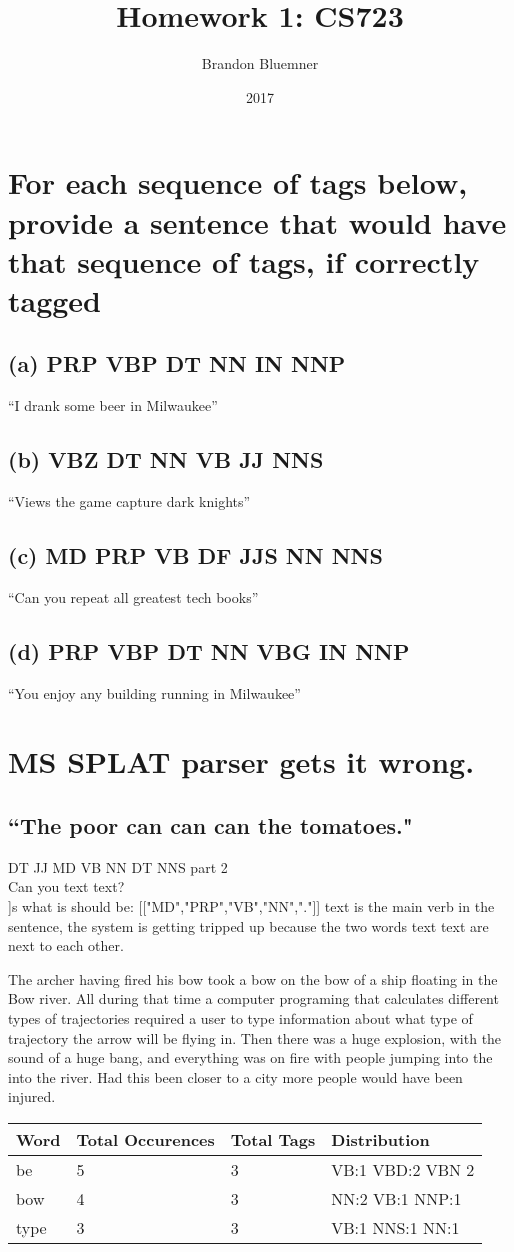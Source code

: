 \documentclass[12pt]{article}
\begin{document}
\title{Homework 1: CS723}
\author{Brandon Bluemner}
\date{2017}
\maketitle
\section{For each sequence of tags below, provide a sentence
 that would have that sequence of tags, if correctly
tagged}
\subsection{(a) PRP VBP DT NN IN NNP}
``I drank some beer in Milwaukee''
\subsection{(b) VBZ DT NN VB JJ NNS}
``Views the game capture dark knights''
\subsection{(c) MD PRP VB DF JJS NN NNS}
``Can you repeat all greatest tech books''
\subsection{(d) PRP VBP DT NN VBG IN NNP}
``You enjoy any building running in Milwaukee''

\section{MS SPLAT parser gets it wrong.}
\subsection{``The poor can can can the tomatoes."}
DT JJ MD VB NN DT NNS
part 2 
\\
Can you text text?
\\
[["MD","PRP","NN","NN","."]]s
what is should be:
[["MD","PRP","VB","NN","."]]
text is the main verb in the sentence, 
the system is getting tripped up because 
the two words text text are next to each other.

The archer having fired his bow took a bow on the bow of a ship floating in the Bow river.
 All during that time a computer programing that calculates 
 different types of trajectories required a user to type
  information about what type of trajectory the arrow will
   be flying in. Then there was a huge explosion, with the
 sound of a huge bang, and everything was on fire with people jumping into the into the river.  Had this been closer to a city more people would have been injured.




\begin{tabular}{ | l | l | l | l | }
	\hline
	Word & Total Occurences & Total Tags & Distribution\\\hline
	be & 5 & 3 & VB:1 VBD:2 VBN 2 \\\hline
	bow & 4 & 3 & NN:2 VB:1 NNP:1\\\hline
	type & 3 & 3 & VB:1  NNS:1 NN:1\\\hline
	\end{tabular}

\cite{*}


\end{document}
